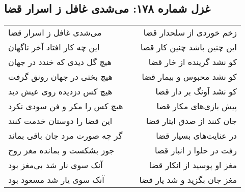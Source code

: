 \begin{center}
\section*{غزل شماره ۱۷۸: می‌شدی غافل ز اسرار قضا}
\label{sec:0178}
\begin{longtable}{l p{0.5cm} r}
می‌شدی غافل ز اسرار قضا
&&
زخم خوردی از سلحدار قضا
\\
این چه کار افتاد آخر ناگهان
&&
این چنین باشد چنین کار قضا
\\
هیچ گل دیدی که خندد در جهان
&&
کو نشد گرینده از خار قضا
\\
هیچ بختی در جهان رونق گرفت
&&
کو نشد محبوس و بیمار قضا
\\
هیچ کس دزدیده روی عیش دید
&&
کو نشد آونگ بر دار قضا
\\
هیچ کس را مکر و فن سودی نکرد
&&
پیش بازی‌های مکار قضا
\\
این قضا را دوستان خدمت کنند
&&
جان کنند از صدق ایثار قضا
\\
گر چه صورت مرد جان باقی بماند
&&
در عنایت‌های بسیار قضا
\\
جوز بشکست و بمانده مغز روح
&&
رفت در حلوا ز انبار قضا
\\
آنک سوی نار شد بی‌مغز بود
&&
مغز او پوسید از انکار قضا
\\
آنک سوی یار شد مسعود بود
&&
مغز جان بگزید و شد یار قضا
\\
\end{longtable}
\end{center}
